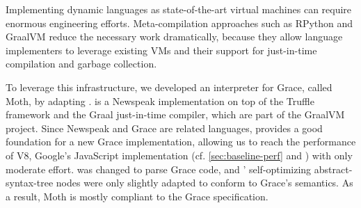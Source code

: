 Implementing dynamic languages as state-of-the-art virtual machines
can require enormous engineering efforts.
Meta-compilation approaches\citep{Marr:2015:MTPE}
such as RPython\citep{Bolz:2009:TMP,Bolz:2013:IMT}
and GraalVM\citep{Wurthinger2013,Wurthinger:2017:PPE}
reduce the necessary work dramatically,
because they allow language implementers to leverage existing VMs
and their support for just-in-time compilation and garbage collection.

To leverage this infrastructure, we developed an interpreter for Grace,
called Moth\citep{Roberts2017}, by adapting \SOMns\citep{SOMns}.
\SOMns is a Newspeak implementation\citep{Bracha:10:NS} on top of the Truffle framework and the Graal just-in-time compiler,
which are part of the GraalVM project.
Since Newspeak and Grace are related languages,
\SOMns provides a good foundation for a new Grace implementation,
allowing us to reach the performance of V8,
Google's JavaScript implementation
(cf. \cref{sec:baseline-perf} and \citet{Marr2016})
with only moderate effort.
\SOMns was changed to parse Grace code, and 
\SOMns' self-optimizing abstract-syntax-tree nodes were only slightly adapted to conform to Grace's semantics.
As a result, Moth is mostly compliant to the Grace specification.






